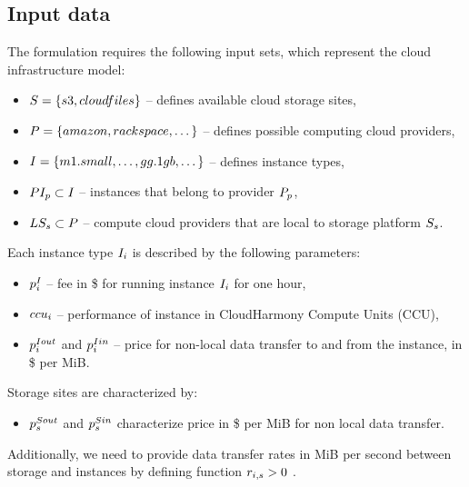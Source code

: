 {\subsection{Input data}
 
  The formulation requires the following input sets, which represent the cloud infrastructure model:
  \begin{itemize}
      \item $S = \{s3, cloudfiles\}$ -- defines available cloud storage
      sites,
      \item $P = \{amazon, rackspace, \dotsc\}$ -- defines
      possible computing cloud providers,
      \item $I = \{m1.small, \dots, gg.1gb, \dotsc\}$ -- defines
      instance types,
      \item $PI_{p} \subset I$ -- instances that
      belong to provider $P_p$,
      \item $LS_{s} \subset P$ -- compute cloud providers
      that are local to storage platform $S_s$.
  \end{itemize}        
    
  Each instance type $I_i$ is described by the following parameters:
  \begin{itemize}
      \item $p^I_i$ -- fee in \$ for running instance $I_i$
      for one hour,
      \item $ccu_i$ -- performance of instance in CloudHarmony Compute Units
      (CCU),
      \item $p^{Iout}_i$ and $p^{Iin}_i$ --
      price for non-local data transfer to and from the instance, in \$ per
      MiB.
  \end{itemize}

  Storage sites are characterized by:
  \begin{itemize}
      \item $p^{Sout}_s$ and $p^{Sin}_s$
      characterize price in \$ per MiB for non local data transfer.
  \end{itemize}

  Additionally, we need to provide data transfer rates in MiB per second between storage and instances by defining function $r_{i,s} > 0$ .

}
